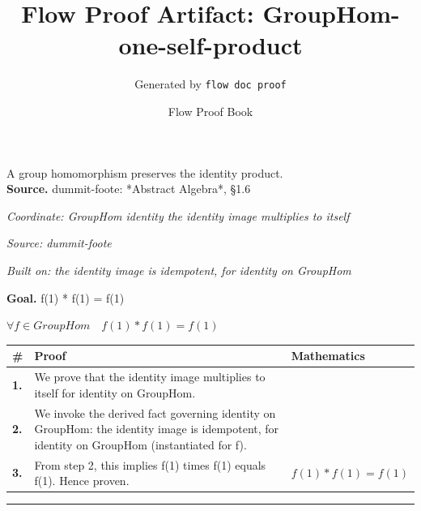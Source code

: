 \documentclass[11pt]{article}
\title{Flow Proof Artifact: GroupHom-one-self-product}
\author{Generated by \texttt{flow doc proof}}
\date{Flow Proof Book}
\theoremstyle{definition}
\begin{document}
\maketitle
A group homomorphism preserves the identity product.\\[0.5em]
\textbf{Source.} dummit-foote: *Abstract Algebra*, §1.6\\[0.5em]
\bigskip
{}\par
\smallskip\noindent\textit{Coordinate: GroupHom \cdot identity \cdot the identity image multiplies to itself}\par
\smallskip\noindent\textit{Source: dummit-foote}\par
\smallskip\noindent\textit{Built on: the identity image is idempotent, for identity on GroupHom}\par
\medskip
\noindent\textbf{Goal.} f(1) * f(1) = f(1)\par
\noindent$\displaystyle \forall f \in GroupHom\quad f(1) * f(1) = f(1)$\par
\medskip
\noindent
\begin{tabular}{@{} >{\raggedright\arraybackslash}p{} >{\raggedright\arraybackslash}p{} >{\raggedleft\arraybackslash}p{} @{}}
\textbf{\#} & \textbf{Proof} & \textbf{Mathematics} \\
\midrule
\textbf{1.} & We prove that the identity image multiplies to itself for identity on GroupHom. & \\[0.45em]
\textbf{2.} & We invoke the derived fact governing identity on GroupHom: the identity image is idempotent, for identity on GroupHom (instantiated for f). & \\[0.45em]
\textbf{3.} & From step 2, this implies f(1) times f(1) equals f(1). Hence proven. & $\displaystyle f(1) * f(1) = f(1)$ \\[0.45em]
\bottomrule
\end{tabular}
\label{thm:GroupHom-identity-the_identity_image_multiplies_to_itself}
\par\medskip\hrule
\end{document}

